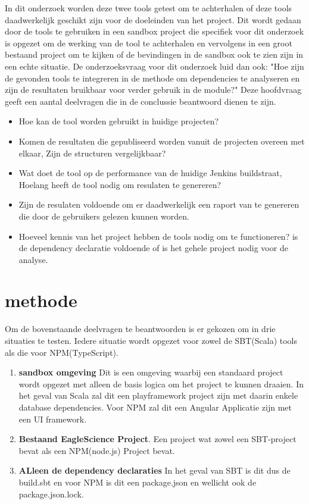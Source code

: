 In dit onderzoek worden deze twee tools getest om te achterhalen of deze tools daadwerkelijk geschikt zijn voor de doeleinden van het project. Dit wordt gedaan door de tools te gebruiken in een sandbox project die specifiek voor dit onderzoek is opgezet om de werking van de tool te achterhalen en vervolgens in een groot bestaand project om te kijken of de bevindingen in de sandbox ook te zien zijn in een echte situatie.
De onderzoeksvraag voor dit onderzoek luid dan ook: "Hoe zijn de gevonden tools te integreren in de methode om dependencies te analyseren en zijn de resultaten bruikbaar voor verder gebruik in de module?" Deze hoofdvraag geeft een aantal deelvragen die in de conclussie beantwoord dienen te zijn.
\begin{itemize}
    \item Hoe kan de tool worden gebruikt in huidige projecten?
    \item Komen de resultaten die gepubliseerd worden vanuit de projecten overeen met elkaar, Zijn de structuren vergelijkbaar?
    \item Wat doet de tool op de performance van de huidige Jenkins buildstraat, Hoelang heeft de tool nodig om resulaten te genereren?
    \item Zijn de resulaten voldoende om er daadwerkelijk een raport van te genereren die door de gebruikers gelezen kunnen worden.
    \item Hoeveel kennis van het project hebben de tools nodig om te functioneren? is de dependency declaratie voldoende of is het gehele project nodig voor de analyse.
\end{itemize}


\section{methode}
Om de bovenstaande deelvragen te beantwoorden is er gekozen om in drie situaties te testen. Iedere situatie wordt opgezet voor zowel de SBT(Scala) tools als die voor NPM(TypeScript).
\begin{enumerate}
    \item \textbf{sandbox omgeving} Dit is een omgeving waarbij een standaard project wordt opgezet met alleen de basis logica om het project te kunnen draaien. In het geval van Scala zal dit een playframework project zijn met daarin enkele database dependencies. Voor NPM zal dit een Angular Applicatie zijn met een UI framework.
    \item \textbf{Bestaand EagleScience Project}. Een project wat zowel een SBT-project bevat als een NPM(node.js) Project bevat.
    \item \textbf{ALleen de dependency declaraties} In het geval van SBT is dit dus de build.sbt en voor NPM is dit  een package.json en wellicht ook de package.json.lock.
\end{enumerate}

